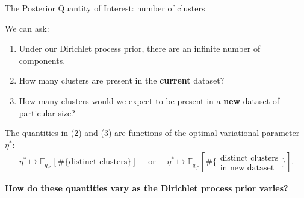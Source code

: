 \documentclass[10pt]{beamer}\usepackage[]{graphicx}\usepackage[]{color}
\newcommand{\Expect}{\mathbb{E}}
\begin{document}
\begin{frame}{The Posterior Quantity of Interest: number of clusters}

We can ask: 
\begin{enumerate}[(1)]
\item Under our Dirichlet process prior, there are an infinite number of components. 

\pause 

\item How many clusters are present in the {\bf current} dataset?

\pause 

\item How many clusters would we expect to be present in a {\bf new} dataset of particular size?

\pause

\end{enumerate}
\vspace{0.2in}
The quantities in (2) and (3) are functions of the optimal variational parameter $\eta^*$: 
%
\begin{align*}
\eta^* \mapsto
\Expect_{q_{\eta^*}} \left[ \#\{\text{distinct clusters}\} \right]
\quad \text{ or } \quad
\eta^* \mapsto
\Expect_{q_{\eta^*}} 
\left[\#\{\substack{\text{distinct clusters}\\\text{in new dataset}}\} \right].
\end{align*}

\begin{mdframed}[style=MyFrame]
\begin{center} 
{\bf How do these quantities vary as the Dirichlet process prior varies?}
\end{center}
\end{mdframed}

\end{frame}
\end{document}
